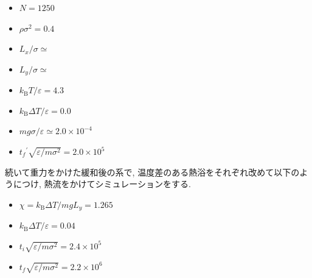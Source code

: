 \begin{itemize}
  \item $N = 1250$
  \item $\rho \sigma^2 = 0.4$
  \item $L_x / \sigma \simeq $
  \item $L_y / \sigma \simeq $
  \item $k_{\text{B}} T/\varepsilon = 4.3$
  \item $k_{\text{B}} \Delta T/\varepsilon = 0.0$
  \item $mg\sigma/\varepsilon \simeq 2.0 \times 10^{-4}$
  \item ${t_f}^{\prime} \sqrt{\varepsilon / m \sigma^2} = 2.0 \times 10^{5}$
\end{itemize}

続いて重力をかけた緩和後の系で, 温度差のある熱浴をそれぞれ改めて以下のようにつけ, 熱流をかけてシミュレーションをする. 

\begin{itemize}
  \item $\chi = k_{\text{B}}\Delta T / mg L_y = 1.265$
  \item $k_{\text{B}} \Delta T/\varepsilon = 0.04$
  \item $t_i \sqrt{\varepsilon / m \sigma^2} = 2.4 \times 10^{5}$
  \item $t_f \sqrt{\varepsilon / m \sigma^2} = 2.2 \times 10^{6}$
\end{itemize}

